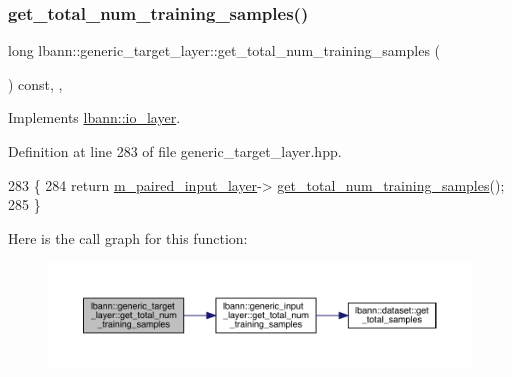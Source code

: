 \subsubsection{\texorpdfstring{get\+\_\+total\+\_\+num\+\_\+training\+\_\+samples()}{get\_total\_num\_training\_samples()}}
{\footnotesize\ttfamily long lbann\+::generic\+\_\+target\+\_\+layer\+::get\+\_\+total\+\_\+num\+\_\+training\+\_\+samples (\begin{DoxyParamCaption}{ }\end{DoxyParamCaption}) const\hspace{0.3cm}{\ttfamily [inline]}, {\ttfamily [override]}, {\ttfamily [virtual]}}



Implements \hyperlink{classlbann_1_1io__layer_a744fe02208657194120714387b49cb28}{lbann\+::io\+\_\+layer}.



Definition at line 283 of file generic\+\_\+target\+\_\+layer.\+hpp.


\begin{DoxyCode}
283                                                        \{
284     \textcolor{keywordflow}{return} \hyperlink{classlbann_1_1generic__target__layer_a84da1260e9feb4fbc3e6f2315e4cab4b}{m\_paired\_input\_layer}->
      \hyperlink{classlbann_1_1generic__input__layer_a5fc757d16e26739cd10e5eabafa6a32b}{get\_total\_num\_training\_samples}();
285   \}
\end{DoxyCode}
Here is the call graph for this function\+:\nopagebreak
\begin{figure}[H]
\begin{center}
\leavevmode
\includegraphics[width=350pt]{classlbann_1_1generic__target__layer_a857306496e1c55cb15cd81301edb010f_cgraph}
\end{center}
\end{figure}
\mbox{\label{classlbann_1_1generic__target__layer_a46f2192139bd8cec23a20e1c9b67869d}} 
